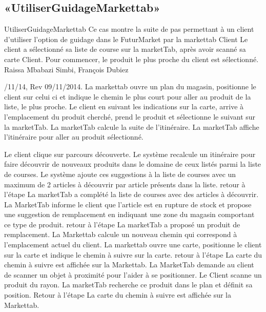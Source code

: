 \subsection{«UtiliserGuidageMarkettab»}

\startCU
\nom UtiliserGuidageMarkettab
\but Ce cas montre la suite de pas permettant à un client d'utiliser l'option de guidage dans le FuturMarket par la markettab
\acteur Client
\precondition Le client a sélectionné sa liste de course sur la marketTab, après avoir scanné sa carte Client. Pour commencer, le produit le plus proche du client est sélectionné.
\auteur Raissa Mbabazi Simbi, François Dubiez
\date 7/11/14, Rev 09/11/2014.
\nominal %
\startnominal
\etape[UGM:SA1] La markettab ouvre un plan du magasin, positionne le client sur celui ci et indique le chemin le plus court pour aller au produit de la liste, le plus proche.
 Le client en suivant les indications sur la carte, arrive à l'emplacement du produit cherché, prend le produit et sélectionne le suivant sur la marketTab.
\etape La marketTab calcule la suite de l'itinéraire.
\stopnominal
\postcondition La marketTab affiche l'itinéraire pour aller au produit sélectionné.

\alternatifs
\startalternatif[UGM:SA1]
\etape Le client clique sur parcours découverte.
\etape Le système recalcule un itinéraire pour faire découvrir de nouveaux produits dans le domaine de ceux listés parmi la liste de courses. Le système ajoute ces suggestions à la liste de courses avec un maximum de 2 articles à découvrir par article présents dans la liste.
\etape retour à l'étape 
\stopcondition
\postcondition La marketTab a complété la liste de courses avec des articles à découvrir.
\stopalternatif
\startalternatif[UGM:SA1]
\etape La MarketTab informe le client que l'article est en rupture de stock et propose une suggestion de remplacement en indiquant une zone du magasin comportant ce type de produit.
\etape retour à l'étape 
\stopcondition
\postcondition La marketTab a proposé un produit de remplacement.
\stopalternatif
{}
\etape La Markettab calcule un nouveau chemin qui correspond à l'emplacement actuel du client. 
\etape La markettab ouvre une carte, positionne le client sur la carte et indique le chemin à suivre sur la carte.
\etape retour à l'étape 
\stopcondition
\postcondition La carte du chemin à suivre est affichée sur la Markettab.
\stopalternatif
\startalternatif[UGM:SA1]
\etape La MarketTab demande au client de scanner un objet à proximité pour l'aider à se positionner. 
\etape Le Client scanne un produit du rayon.
\etape La marketTab recherche ce produit dans le plan et définit sa position.
\etape Retour à l'étape \in[UGM:SA1]
\stopcondition
\postcondition La carte du chemin à suivre est affichée sur la Markettab.
\stopalternatif

